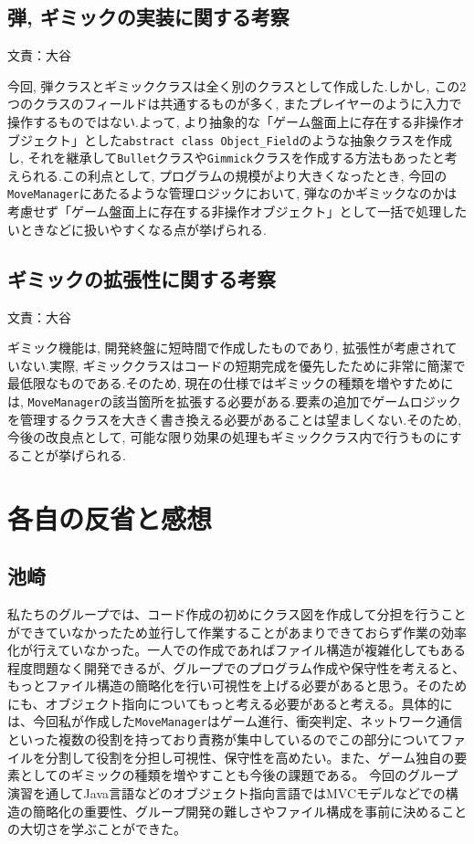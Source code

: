 \documentclass[11pt,a4j]{jarticle}
\begin{document}
\subsection{弾, ギミックの実装に関する考察}
\begin{flushright}
  文責：大谷
\end{flushright}
今回, 弾クラスとギミッククラスは全く別のクラスとして作成した.しかし, この2つのクラスのフィールドは共通するものが多く, またプレイヤーのように入力で操作するものではない.よって, より抽象的な「ゲーム盤面上に存在する非操作オブジェクト」とした\texttt{abstract class Object\_Field}のような抽象クラスを作成し, それを継承して\texttt{Bullet}クラスや\texttt{Gimmick}クラスを作成する方法もあったと考えられる.この利点として, プログラムの規模がより大きくなったとき, 今回の\texttt{MoveManager}にあたるような管理ロジックにおいて, 弾なのかギミックなのかは考慮せず「ゲーム盤面上に存在する非操作オブジェクト」として一括で処理したいときなどに扱いやすくなる点が挙げられる.

\subsection{ギミックの拡張性に関する考察}
\begin{flushright}
  文責：大谷
\end{flushright}
ギミック機能は, 開発終盤に短時間で作成したものであり, 拡張性が考慮されていない.実際, ギミッククラスはコードの短期完成を優先したために非常に簡潔で最低限なものである.そのため, 現在の仕様ではギミックの種類を増やすためには, \texttt{MoveManager}の該当箇所を拡張する必要がある.要素の追加でゲームロジックを管理するクラスを大きく書き換える必要があることは望ましくない.そのため, 今後の改良点として, 可能な限り効果の処理もギミッククラス内で行うものにすることが挙げられる.



\section{各自の反省と感想}
\subsection{池崎}
私たちのグループでは、コード作成の初めにクラス図を作成して分担を行うことができていなかったため並行して作業することがあまりできておらず作業の効率化が行えていなかった。一人での作成であればファイル構造が複雑化してもある程度問題なく開発できるが、グループでのプログラム作成や保守性を考えると、もっとファイル構造の簡略化を行い可視性を上げる必要があると思う。そのためにも、オブジェクト指向についてもっと考える必要があると考える。具体的には、今回私が作成した\texttt{MoveManager}はゲーム進行、衝突判定、ネットワーク通信といった複数の役割を持っており責務が集中しているのでこの部分についてファイルを分割して役割を分担し可視性、保守性を高めたい。また、ゲーム独自の要素としてのギミックの種類を増やすことも今後の課題である。
今回のグループ演習を通してJava言語などのオブジェクト指向言語ではMVCモデルなどでの構造の簡略化の重要性、グループ開発の難しさやファイル構成を事前に決めることの大切さを学ぶことができた。
\end{document}
